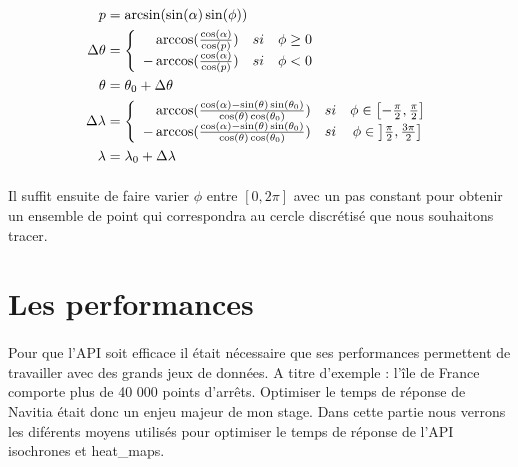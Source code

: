 \documentclass[a4paper]{report}
\begin{document}
\begin{align} 
	p&=\arcsin(\sin(\alpha)\sin(\phi)) \\
	\Delta \theta &= 
	\left \{
	\begin{array}{r c l}
		\arccos(\frac{\cos(\alpha)}{\cos(p)}) \quad si& \phi \ge 0 \\
		-\arccos(\frac{\cos(\alpha)}{\cos(p)}) \quad si& \phi < 0\\
	\end{array}
	\right. \\
	\theta &= \theta_{0} + \Delta \theta \\
	\Delta \lambda &= 
	\left \{
	\begin{array}{r c l}
		\arccos(\frac{\cos(\alpha) - \sin(\theta)\sin(\theta_0)}{\cos(\theta)\cos(\theta_0)}) \quad si& \phi \in \left[ -\frac{\pi}{2},\frac{\pi}{2} \right]\\
		-\arccos(\frac{\cos(\alpha) - \sin(\theta)\sin(\theta_0)}{\cos(\theta)\cos(\theta_0)}) \quad si& \phi \in \left] \frac{\pi}{2},\frac{3\pi}{2} \right]\\
	\end{array}
	\right. \\
	\lambda &= \lambda_{0} + \Delta \lambda 
\end{align}

\paragraph{} Il suffit ensuite de faire varier $\phi$ entre $\left[ 0, 2\pi \right]$ avec un pas constant pour obtenir un ensemble de point qui correspondra au cercle discrétisé que nous souhaitons tracer.

\section{Les performances}

\paragraph{}Pour que l'API soit efficace il était nécessaire que ses performances permettent de travailler avec des grands jeux de données. A titre d'exemple : l'île de France comporte plus de 40 000 points d'arrêts. Optimiser le temps de réponse de Navitia était donc un enjeu majeur de mon stage. Dans cette partie nous verrons les diférents moyens utilisés pour optimiser le temps de réponse de l'API isochrones et heat\_maps. 
\end{document}
